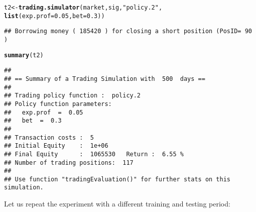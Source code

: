\documentclass{article}\usepackage[]{graphicx}\usepackage[]{color}
\makeatletter
\newcommand{\hlnum}[1]{\textcolor[rgb]{0.686,0.059,0.569}{#1}}%
\newcommand{\hlstr}[1]{\textcolor[rgb]{0.192,0.494,0.8}{#1}}%
\newcommand{\hlstd}[1]{\textcolor[rgb]{0.345,0.345,0.345}{#1}}%
\newcommand{\hlkwb}[1]{\textcolor[rgb]{0.69,0.353,0.396}{#1}}%
\newcommand{\hlkwc}[1]{\textcolor[rgb]{0.333,0.667,0.333}{#1}}%
\newcommand{\hlkwd}[1]{\textcolor[rgb]{0.737,0.353,0.396}{\textbf{#1}}}%
\newenvironment{kframe}{%
 \def\at@end@of@kframe{}%
 \ifinner\ifhmode%
  \def\at@end@of@kframe{\end{minipage}}%
  \begin{minipage}{\columnwidth}%
 \fi\fi%
 \def\FrameCommand##1{\hskip\@totalleftmargin \hskip-\fboxsep
 \colorbox{shadecolor}{##1}\hskip-\fboxsep
     \hskip-\linewidth \hskip-\@totalleftmargin \hskip\columnwidth}%
 \MakeFramed {\advance\hsize-\width
   \@totalleftmargin\z@ \linewidth\hsize
   \@setminipage}}%
 {\par\unskip\endMakeFramed%
 \at@end@of@kframe}
\newenvironment{knitrout}{}{} %
\makeatother
\begin{document}
\begin{knitrout}
\color{fgcolor}\begin{kframe}
\begin{alltt}
\hlstd{t2} \hlkwb{<-} \hlkwd{trading.simulator}\hlstd{(market, sig,} \hlstr{"policy.2"}\hlstd{,}
                        \hlkwd{list}\hlstd{(}\hlkwc{exp.prof} \hlstd{=} \hlnum{0.05}\hlstd{,} \hlkwc{bet} \hlstd{=} \hlnum{0.3}\hlstd{))}
\end{alltt}
\begin{verbatim}
## Borrowing money ( 185420 ) for closing a short position (PosID= 90 )
\end{verbatim}
\begin{alltt}
\hlkwd{summary}\hlstd{(t2)}
\end{alltt}
\begin{verbatim}
## 
## == Summary of a Trading Simulation with  500  days ==
## 
## Trading policy function :  policy.2 
## Policy function parameters:
## 	 exp.prof  =  0.05 
## 	 bet  =  0.3 
## 
## Transaction costs :  5 
## Initial Equity    :  1e+06 
## Final Equity      :  1065530   Return :  6.55 %
## Number of trading positions:  117 
## 
## Use function "tradingEvaluation()" for further stats on this simulation.
\end{verbatim}
\end{kframe}
\end{knitrout}
Let us repeat the experiment with a different training and testing period:
\end{document}
